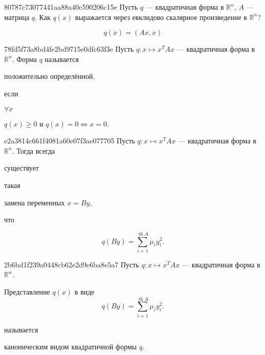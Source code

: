 \begin{note}{80787c73077441aa88a40c590206c15e}
    Пусть \({ q }\) --- квадратичная форма в \({ \mathbb R^{n} }\), \({ A }\) --- матрица \({ q }\).
    Как \({ q(x) }\) выражается через евклидово скалярное произведение в \({ \mathbb R^{n} }\)?

    \begin{cloze}{1}
        \[
            q(x) = (Ax, x)
        \]
    \end{cloze}
\end{note}

\begin{note}{78fd5f73a8bd4fe2bd9715e0dfc63f3e}
    Пусть \({ q : x \mapsto x^{T}Ax }\) --- квадратичная форма в \({ \mathbb R^{n} }\).
    Форма \({ q }\) называется \begin{icloze}{2}положительно определённой,\end{icloze} если
    \begin{icloze}{1}
        \({ \forall x }\)
        \begin{center}
            \({ q(x) \geqslant 0 }\) \quad и \quad \({ q(x) = 0 \iff x = 0 }\).
        \end{center}
    \end{icloze}
\end{note}

\begin{note}{e2a3814c661f4081a60e07f3ae077705}
    Пусть \({ q : x \mapsto x^{T}Ax }\) --- квадратичная форма в \({ \mathbb R^{n} }\).
    Тогда всегда \begin{icloze}{3}существует\end{icloze} такая \begin{icloze}{2}замена переменных \({ x = By }\),\end{icloze} что
    \begin{icloze}{1}
        \[
            q(By) = \sum_{i=1}^{\operatorname{rk} A} \mu_i y_i^2.
        \]
    \end{icloze}
\end{note}

\begin{note}{2b6bd1f239a0448cb62e2d9e6ba8e5a7}
    Пусть \({ q : x \mapsto x^{T}Ax }\) --- квадратичная форма в \({ \mathbb R^{n} }\).
    \begin{icloze}{1}
        Представление \({ q(x) }\) в виде
        \[
            q(By) = \sum_{i=1}^{\operatorname{rk} A} \mu_i y_i^2.
        \]
    \end{icloze}
    называется \begin{icloze}{2}каноническим видом квадратичной формы \({ q }\).\end{icloze}
\end{note}

